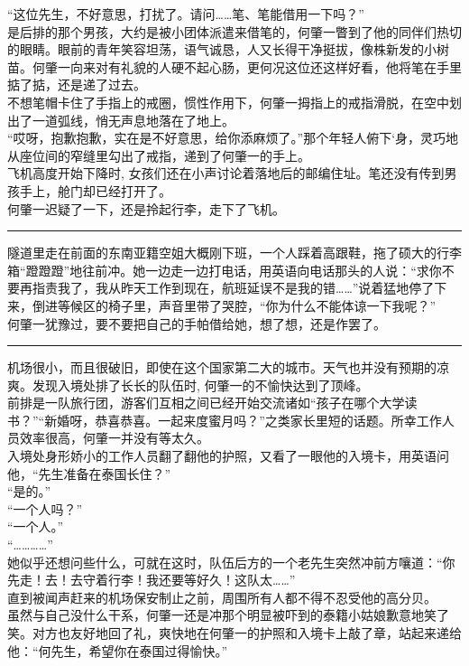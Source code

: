 \documentclass[oneside,11pt]{memoir} %
\begin{document}
\begin{CJK}{UTF8}{gbsn}
    “这位先生，不好意思，打扰了。请问……笔、笔能借用一下吗？”\\\indent
    是后排的那个男孩，大约是被小团体派遣来借笔的，何肇一瞥到了他的同伴们热切的眼睛。眼前的青年笑容坦荡，语气诚恳，人又长得干净挺拔，像株新发的小树苗。何肇一向来对有礼貌的人硬不起心肠，更何况这位还这样好看，他将笔在手里掂了掂，还是递了过去。\\\indent
    不想笔帽卡住了手指上的戒圈，惯性作用下，何肇一拇指上的戒指滑脱，在空中划出了一道弧线，悄无声息地落在了地上。\\\indent
     “哎呀，抱歉抱歉，实在是不好意思，给你添麻烦了。”那个年轻人俯下`身，灵巧地从座位间的窄缝里勾出了戒指，递到了何肇一的手上。\\\indent
   飞机高度开始下降时, 女孩们还在小声讨论着落地后的邮编住址。笔还没有传到男孩手上，舱门却已经打开了。\\\indent
   何肇一迟疑了一下，还是拎起行李，走下了飞机。\\\indent
\rule{-3pt}{30pt}
    隧道里走在前面的东南亚籍空姐大概刚下班，一个人踩着高跟鞋，拖了硕大的行李箱“蹬蹬蹬”地往前冲。她一边走一边打电话，用英语向电话那头的人说：“求你不要再指责我了，我从昨天工作到现在，航班延误不是我的错……”说着猛地停了下来，倒进等候区的椅子里，声音里带了哭腔，“你为什么不能体谅一下我呢？”\\\indent
    何肇一犹豫过，要不要把自己的手帕借给她，想了想，还是作罢了。\\\indent
\rule{-3pt}{30pt}
    机场很小，而且很破旧，即使在这个国家第二大的城市。天气也并没有预期的凉爽。发现入境处排了长长的队伍时, 何肇一的不愉快达到了顶峰。\\\indent
    前排是一队旅行团，游客们互相之间已经开始交流诸如“孩子在哪个大学读书？”“新婚呀，恭喜恭喜。一起来度蜜月吗？”之类家长里短的话题。所幸工作人员效率很高，何肇一并没有等太久。\\\indent
    入境处身形娇小的工作人员翻了翻他的护照，又看了一眼他的入境卡，用英语问他，“先生准备在泰国长住？”\\\indent
    “是的。”\\\indent
    “一个人吗？”\\\indent
    “一个人。”\\\indent
    “…………”\\\indent
    她似乎还想问些什么，可就在这时，队伍后方的一个老先生突然冲前方嚷道：“你先走！去！去守着行李！我还要等好久！这队太……”\\\indent
    直到被闻声赶来的机场保安制止之前，周围所有人都不得不忍受他的高分贝。\\\indent
    虽然与自己没什么干系，何肇一还是冲那个明显被吓到的泰籍小姑娘歉意地笑了笑。对方也友好地回了礼，爽快地在何肇一的护照和入境卡上敲了章，站起来递给他：“何先生，希望你在泰国过得愉快。”\\\indent

\end{CJK}
\end{document}
